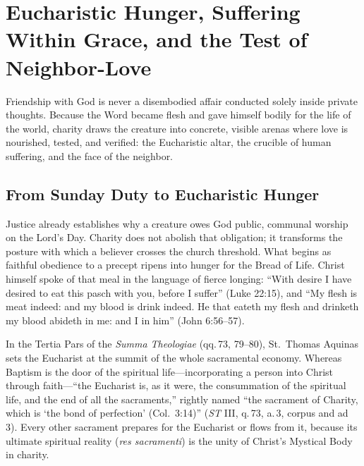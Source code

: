\section{Eucharistic Hunger, Suffering Within Grace, and the Test of Neighbor-Love}

Friendship with God is never a disembodied affair conducted solely inside private thoughts. Because the Word became flesh and gave himself bodily for the life of the world, charity draws the creature into concrete, visible arenas where love is nourished, tested, and verified: the Eucharistic altar, the crucible of human suffering, and the face of the neighbor.

\subsection*{From Sunday Duty to Eucharistic Hunger}

Justice already establishes why a creature owes God public, communal worship on the Lord's Day. Charity does not abolish that obligation; it transforms the posture with which a believer crosses the church threshold. What begins as faithful obedience to a precept ripens into hunger for the Bread of Life. Christ himself spoke of that meal in the language of fierce longing: ``With desire I have desired to eat this pasch with you, before I suffer'' (Luke 22:15), and ``My flesh is meat indeed: and my blood is drink indeed. He that eateth my flesh and drinketh my blood abideth in me: and I in him'' (John 6:56--57).

In the Tertia Pars of the \emph{Summa Theologiae} (qq.\,73, 79--80), St.\ Thomas Aquinas sets the Eucharist at the summit of the whole sacramental economy. Whereas Baptism is the door of the spiritual life---incorporating a person into Christ through faith---``the Eucharist is, as it were, the consummation of the spiritual life, and the end of all the sacraments,'' rightly named ``the sacrament of Charity, which is `the bond of perfection' (Col.\ 3:14)'' (\emph{ST} III, q.\,73, a.\,3, corpus and ad 3). Every other sacrament prepares for the Eucharist or flows from it, because its ultimate spiritual reality (\emph{res sacramenti}) is the unity of Christ's Mystical Body in charity.

